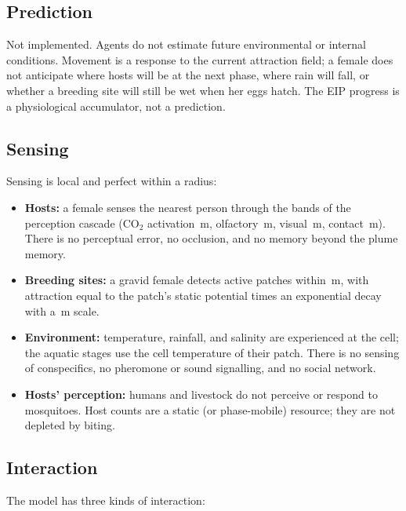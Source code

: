 \documentclass[11pt,a4paper]{article}
\begin{document}
\subsection{Prediction}

Not implemented. Agents do not estimate future environmental or internal
conditions. Movement is a response to the current attraction field; a
female does not anticipate where hosts will be at the next phase, where
rain will fall, or whether a breeding site will still be wet when her
eggs hatch. The EIP progress is a physiological accumulator, not a
prediction.

\subsection{Sensing}

Sensing is local and perfect within a radius:

\begin{itemize}
\item \textbf{Hosts:} a female senses the nearest person through the bands of the
  perception cascade (CO$_2$ activation \,m, olfactory
  \,m, visual \,m, contact
  \,m). There is no perceptual error, no occlusion, and no memory beyond the plume memory.
\item \textbf{Breeding sites:} a gravid female detects active patches
  within \,m, with attraction equal to
  the patch's static
  potential times an exponential decay with a \,m
  scale.
\item \textbf{Environment:} temperature, rainfall, and salinity are
  experienced at the cell; the aquatic stages use the cell temperature
  of their patch. There is no sensing of conspecifics, no pheromone or
  sound signalling, and no social network.
\item \textbf{Hosts' perception:} humans and livestock do not perceive or
  respond to mosquitoes. Host counts are a static (or phase-mobile)
  resource; they are not depleted by biting.
\end{itemize}

\subsection{Interaction}

The model has three kinds of interaction:
\end{document}
